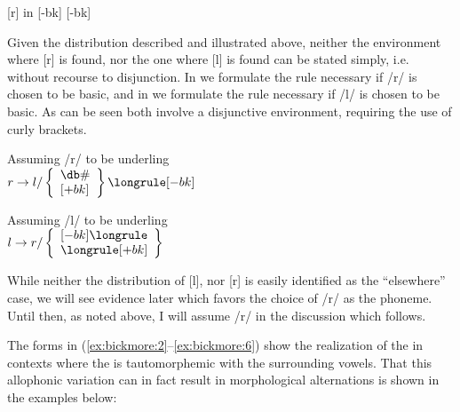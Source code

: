 \documentclass[output=paper
,newtxmath
,modfonts
,nonflat]{langsci/langscibook}
\begin{document}
\ea\label{ex:bickmore:7}
[r] in  [-bk] \underline{ }\underline{ } [-bk]
\ea\label{ex:bickmore:7a}
\ex\label{ex:bickmore:7b}
\ex\label{ex:bickmore:7c}
\ex\label{ex:bickmore:7d}
\z
\z

Given the distribution described and illustrated above, neither the environment where [r] is found, nor the one where [l] is found can be stated simply, i.e. without recourse to disjunction. In  we formulate the rule necessary if /r/ is chosen to be basic, and in  we formulate the rule necessary if /l/ is chosen to be basic. As can be seen both involve a disjunctive environment, requiring the use of curly brackets. 


\ea\label{ex:bickmore:8}
Assuming /r/ to be underling    \\
$r\to l/
\left\{
\begin{array}{l}
{\db}\#\\{}
[+bk]
\end{array}
\right\}
{\longrule}
[-bk]
$


 
 \z

\ea\label{ex:bickmore:9}
Assuming /l/ to be underling\\
$l\to r/
\left\{
\begin{array}{l}
[-bk]{\longrule}\\
{\longrule}[+bk]
\end{array}
\right\} 
$

 
 
\z


 

While neither the distribution of [l], nor [r] is easily identified as the “elsewhere” case, we will see evidence later which favors the choice of /r/ as the phoneme. Until then, as noted above, I will assume /r/ in the discussion which follows. 

The forms in (\ref{ex:bickmore:2}--\ref{ex:bickmore:6}) show the realization of the  in contexts where the  is tautomorphemic with the surrounding vowels. That this allophonic variation can in fact result in morphological alternations is shown in the examples below:
\end{document}
